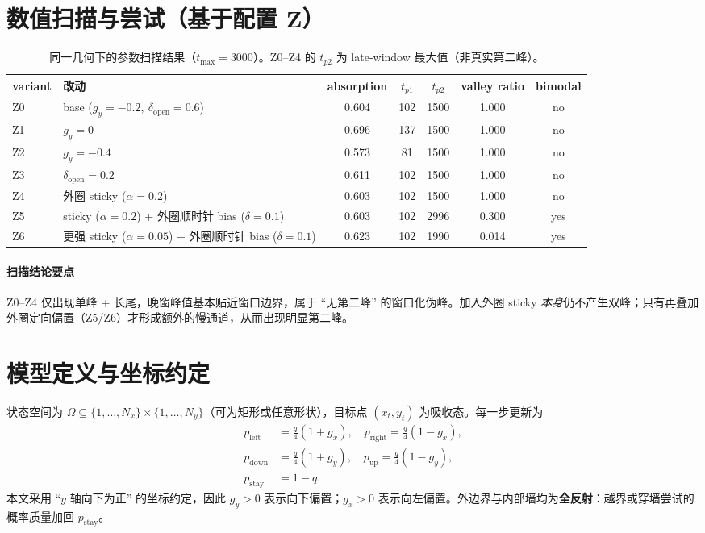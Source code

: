 \documentclass[11pt,fontset=fandol]{ctexart}
\begin{document}
\section*{数值扫描与尝试（基于配置 Z）}
\begin{table}[!htbp]
  \centering
  \scriptsize
  \begin{tabular}{l l c c c c c}
    \toprule
    variant & 改动 & absorption & $t_{p1}$ & $t_{p2}$ & valley ratio & bimodal \\
    \midrule
    Z0 & base ($g_y=-0.2,\ \delta_{\text{open}}=0.6$) & 0.604 & 102 & 1500 & 1.000 & no \\
    Z1 & $g_y=0$ & 0.696 & 137 & 1500 & 1.000 & no \\
    Z2 & $g_y=-0.4$ & 0.573 & 81 & 1500 & 1.000 & no \\
    Z3 & $\delta_{\text{open}}=0.2$ & 0.611 & 102 & 1500 & 1.000 & no \\
    Z4 & 外圈 sticky ($\alpha=0.2$) & 0.603 & 102 & 1500 & 1.000 & no \\
    Z5 & sticky ($\alpha=0.2$) + 外圈顺时针 bias ($\delta=0.1$) & 0.603 & 102 & 2996 & 0.300 & yes \\
    Z6 & 更强 sticky ($\alpha=0.05$) + 外圈顺时针 bias ($\delta=0.1$) & 0.623 & 102 & 1990 & 0.014 & yes \\
    \bottomrule
  \end{tabular}
  \caption{同一几何下的参数扫描结果（$t_{\max}=3000$）。Z0--Z4 的 $t_{p2}$ 为 late-window 最大值（非真实第二峰）。}
  \label{tab:scan}
\end{table}

\paragraph{扫描结论要点}
Z0--Z4 仅出现单峰 + 长尾，晚窗峰值基本贴近窗口边界，属于 ``无第二峰'' 的窗口化伪峰。加入外圈 sticky \emph{本身}仍不产生双峰；只有再叠加外圈定向偏置（Z5/Z6）才形成额外的慢通道，从而出现明显第二峰。

\section{模型定义与坐标约定}
状态空间为 $\Omega\subseteq\{1,\dots,N_x\}\times\{1,\dots,N_y\}$（可为矩形或任意形状），目标点 $(x_t,y_t)$ 为吸收态。每一步更新为
\begin{align}
  p_{\text{left}} &= \frac{q}{4}(1+g_x),\quad p_{\text{right}} = \frac{q}{4}(1-g_x),\\
  p_{\text{down}} &= \frac{q}{4}(1+g_y),\quad p_{\text{up}} = \frac{q}{4}(1-g_y),\\
  p_{\text{stay}} &= 1-q.
\end{align}
本文采用 ``$y$ 轴向下为正'' 的坐标约定，因此 $g_y>0$ 表示向下偏置；$g_x>0$ 表示向左偏置。外边界与内部墙均为\textbf{全反射}：越界或穿墙尝试的概率质量加回 $p_{\text{stay}}$。
\end{document}
